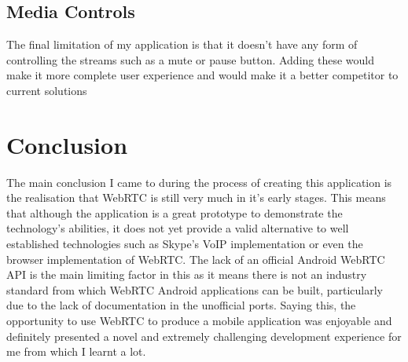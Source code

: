 \documentclass[]{report}
\begin{document}
			\subsection{Media Controls}
			The final limitation of my application is that it doesn't have any form of controlling the streams such as a mute or pause button. Adding these would make it more complete user experience and would make it a better competitor to current solutions 
						
			\section{Conclusion}
			The main conclusion I came to during the process of creating this application is the realisation that WebRTC is still very much in it's early stages. This means that although the application is a great prototype to demonstrate the technology's abilities, it does not yet provide a valid alternative to well established technologies such as Skype's VoIP implementation or even the browser implementation of WebRTC. The lack of an official Android WebRTC API is the main limiting factor in this as it means there is not an industry standard from which WebRTC Android applications can be built, particularly due to the lack of documentation in the unofficial ports.
			Saying this, the opportunity to use WebRTC to produce a mobile application was enjoyable and definitely presented a novel and extremely challenging development experience for me from which I learnt a lot.
				
	\appendix
\end{document}
